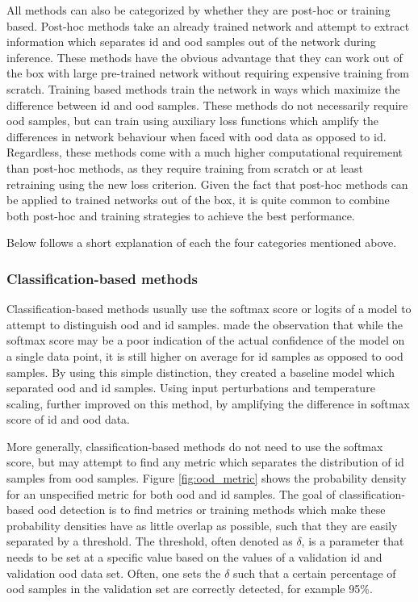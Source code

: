 \documentclass[UKenglish]{uiomasterthesis} %
\theoremstyle{definition}
\begin{document}
All methods can also be categorized by whether they are post-hoc or training based. Post-hoc methods take an already trained network and attempt to extract information which separates \ac{id} and \ac{ood} samples out of the network during inference. These methods have the obvious advantage that they can work out of the box with large pre-trained network without requiring expensive training from scratch. Training based methods train the network in ways which maximize the difference between \ac{id} and \ac{ood} samples. These methods do not necessarily require \ac{ood} samples, but can train using auxiliary loss functions which amplify the differences in network behaviour when faced with \ac{ood} data as opposed to \ac{id}. Regardless, these methods come with a much higher computational requirement than post-hoc methods, as they require training from scratch or at least retraining using the new loss criterion. Given the fact that post-hoc methods can be applied to trained networks out of the box, it is quite common to combine both post-hoc and training strategies to achieve the best performance.

Below follows a short explanation of each the four categories mentioned above.

\subsubsection{Classification-based methods}

Classification-based methods usually use the softmax score or logits of a model to attempt to distinguish \ac{ood} and \ac{id} samples. \cite{oodbaseline} made the observation that while the softmax score may be a poor indication of the actual confidence of the model on a single data point, it is still higher on average for \ac{id} samples as opposed to \ac{ood} samples. By using this simple distinction, they created a baseline model which separated \ac{ood} and \ac{id} samples. Using input perturbations and temperature scaling, \cite{odin} further improved on this method, by amplifying the difference in softmax score of \ac{id} and \ac{ood} data. 

More generally, classification-based methods do not need to use the softmax score, but may attempt to find any metric which separates the distribution of \ac{id} samples from \ac{ood} samples. Figure \ref{fig:ood_metric} shows the probability density for an unspecified metric for both \ac{ood} and \ac{id} samples. The goal of classification-based \ac{ood} detection is to find metrics or training methods which make these probability densities have as little overlap as possible, such that they are easily separated by a threshold. The threshold, often denoted as $\delta$, is a parameter that needs to be set at a specific value based on the values of a validation \ac{id} and validation \ac{ood} data set. Often, one sets the $\delta$ such that a certain percentage of \ac{ood} samples in the validation set are correctly detected, for example 95\%.
\end{document}
